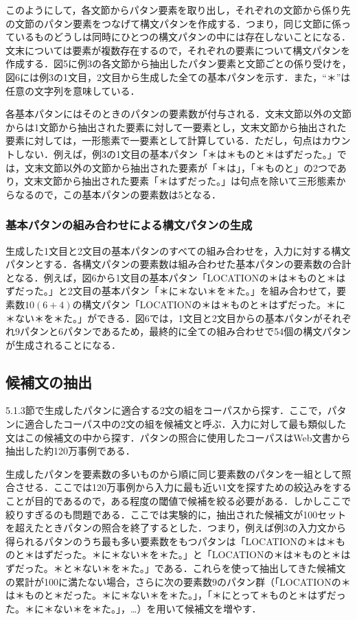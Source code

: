 \documentclass[japanese]{jnlp_1.4}
\begin{document}
このようにして，各文節からパタン要素を取り出し，それぞれの文節から係り先の文節のパタン要素をつなげて構文パタンを作成する．つまり，同じ文節に係っているものどうしは同時にひとつの構文パタンの中には存在しないことになる．文末については要素が複数存在するので，それぞれの要素について構文パタンを作成する．図5に例3の各文節から抽出したパタン要素と文節ごとの係り受けを，図6には例3の1文目，2文目から生成した全ての基本パタンを示す．また，``＊''は任意の文字列を意味している．

各基本パタンにはそのときのパタンの要素数が付与される．文末文節以外の文節からは1文節から抽出された要素に対して一要素とし，文末文節から抽出された要素に対しては，一形態素で一要素として計算している．ただし，句点はカウントしない．例えば，例3の1文目の基本パタン「＊は＊ものと＊はずだった。」では，文末文節以外の文節から抽出された要素が「＊は」，「＊ものと」の2つであり，文末文節から抽出された要素「＊はずだった。」は句点を除いて三形態素からなるので，この基本パタンの要素数は5となる．

\subsubsection{基本パタンの組み合わせによる構文パタンの生成}

生成した1文目と2文目の基本パタンのすべての組み合わせを，入力に対する構文パタンとする．各構文パタンの要素数は組み合わせた基本パタンの要素数の合計となる．例えば，図6から1文目の基本パタン「LOCATIONの＊は＊ものと＊はずだった。」と2文目の基本パタン「＊に＊ない＊を＊た。」を組み合わせて，要素数$10(6+4)$の構文パタン「LOCATIONの＊は＊ものと＊はずだった。＊に＊ない＊を＊た。」ができる．図6では，1文目と2文目からの基本パタンがそれぞれ9パタンと6パタンであるため，最終的に全ての組み合わせで54個の構文パタンが生成されることになる．

\subsection{候補文の抽出}

5.1.3節で生成したパタンに適合する2文の組をコーパスから探す．ここで，パタンに適合したコーパス中の2文の組を候補文と呼ぶ．入力に対して最も類似した文はこの候補文の中から探す．パタンの照合に使用したコーパスはWeb文書から抽出した約120万事例である．

生成したパタンを要素数の多いものから順に同じ要素数のパタンを一組として照合させる．ここでは120万事例から入力に最も近い1文を探すための絞込みをすることが目的であるので，ある程度の閾値で候補を絞る必要がある．しかしここで絞りすぎるのも問題である．ここでは実験的に，抽出された候補文が100セットを超えたときパタンの照合を終了するとした．つまり，例えば例3の入力文から得られるパタンのうち最も多い要素数をもつパタンは「LOCATIONの＊は＊ものと＊はずだった。＊に＊ない＊を＊た。」と「LOCATIONの＊は＊ものと＊はずだった。＊と＊ない＊を＊た。」である．これらを使って抽出してきた候補文の累計が100に満たない場合，さらに次の要素数9のパタン群（「LOCATIONの＊は＊ものと＊だった。＊に＊ない＊を＊た。」，「＊にとって＊ものと＊はずだった。＊に＊ない＊を＊た。」，…）を用いて候補文を増やす．
\end{document}
